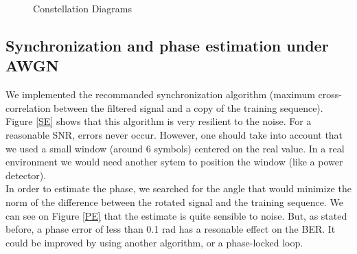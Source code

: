 \documentclass[a4paper,12pt]{article}
\begin{document}
\begin{figure}[ht]
\caption{Constellation Diagrams}
\label{Constellation}
\end{figure}


\subsection{Synchronization and phase estimation under AWGN}
We implemented the recommanded synchronization algorithm (maximum cross-correlation between the filtered signal and a copy of the training sequence). Figure \ref{SE} shows that this algorithm is very resilient to the noise. For a reasonable SNR, errors never occur. However, one should take into account that we used a small window (around 6 symbols) centered on the real value. In a real environment we would need another sytem to position the window (like a power detector). \\

In order to estimate the phase, we searched for the angle that would minimize the norm of the difference between the rotated signal and the training sequence. We can see on Figure \ref{PE} that the estimate is quite sensible to noise. But, as stated before, a phase error of less than 0.1 rad has a resonable effect on the BER. It could be improved by using another algorithm, or a phase-locked loop.
\end{document}
